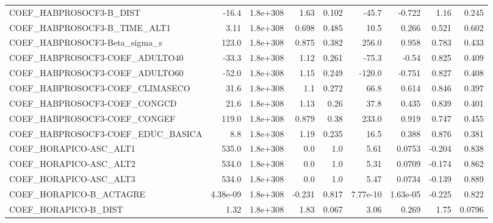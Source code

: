 \begin{tabular}{lrrrrrrrr}
COEF\_HABPROSOCF3-B\_DIST           &       -16.4 &     1.8e+308 &    1.63 &    0.102 &      -45.7 &      -0.722 &         1.16 &         0.245 \\
COEF\_HABPROSOCF3-B\_TIME\_ALT1      &        3.11 &     1.8e+308 &   0.698 &    0.485 &       10.5 &       0.266 &        0.521 &         0.602 \\
COEF\_HABPROSOCF3-Beta\_sigma\_s     &       123.0 &     1.8e+308 &   0.875 &    0.382 &      256.0 &       0.958 &        0.783 &         0.433 \\
COEF\_HABPROSOCF3-COEF\_ADULTO40    &       -33.3 &     1.8e+308 &    1.12 &    0.261 &      -75.3 &       -0.54 &        0.825 &         0.409 \\
COEF\_HABPROSOCF3-COEF\_ADULTO60    &       -52.0 &     1.8e+308 &    1.15 &    0.249 &     -120.0 &      -0.751 &        0.827 &         0.408 \\
COEF\_HABPROSOCF3-COEF\_CLIMASECO   &        31.6 &     1.8e+308 &     1.1 &    0.272 &       66.8 &       0.614 &        0.846 &         0.397 \\
COEF\_HABPROSOCF3-COEF\_CONGCD      &        21.6 &     1.8e+308 &    1.13 &     0.26 &       37.8 &       0.435 &        0.839 &         0.401 \\
COEF\_HABPROSOCF3-COEF\_CONGEF      &       119.0 &     1.8e+308 &   0.879 &     0.38 &      233.0 &       0.919 &        0.747 &         0.455 \\
COEF\_HABPROSOCF3-COEF\_EDUC\_BASICA &         8.8 &     1.8e+308 &    1.19 &    0.235 &       16.5 &       0.388 &        0.876 &         0.381 \\
COEF\_HORAPICO-ASC\_ALT1            &       535.0 &     1.8e+308 &     0.0 &      1.0 &       5.61 &      0.0753 &       -0.204 &         0.838 \\
COEF\_HORAPICO-ASC\_ALT2            &       534.0 &     1.8e+308 &     0.0 &      1.0 &       5.31 &      0.0709 &       -0.174 &         0.862 \\
COEF\_HORAPICO-ASC\_ALT3            &       534.0 &     1.8e+308 &     0.0 &      1.0 &       5.47 &      0.0734 &       -0.139 &         0.889 \\
COEF\_HORAPICO-B\_ACTAGRE           &    4.38e-09 &     1.8e+308 &  -0.231 &    0.817 &   7.77e-10 &    1.63e-05 &       -0.225 &         0.822 \\
COEF\_HORAPICO-B\_DIST              &        1.32 &     1.8e+308 &    1.83 &    0.067 &       3.06 &       0.269 &         1.75 &        0.0796 \\

\end{tabular}
